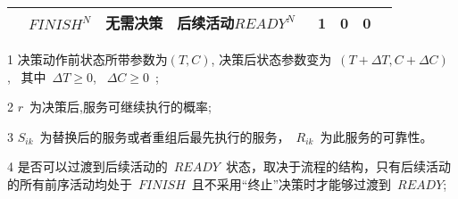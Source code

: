 \begin{table}[htbp]
\begin{threeparttable}
\begin{tabular}{llllllll}
            \multicolumn{1}{c}{} 
            & $FINISH^N$
            & \multicolumn{1}{c}{无需决策} 
            & \multicolumn{1}{l}{后续活动$READY^N$~\tnote{4}} 
            & \multicolumn{1}{c}{1} 
            & \multicolumn{1}{c}{0} 
            & \multicolumn{1}{c}{0} \\
            \bottomrule
            
        \end{tabular}%
        \begin{tablenotes}
            \item[1] 决策动作前状态所带参数为$(T,C)$, 决策后状态参数变为~$(T+\Delta T, C+\Delta C)$,~ 其中~$\Delta T \ge 0$, ~$\Delta C \ge 0$~; 
            \item[2] $r$~为决策后,服务可继续执行的概率;
            \item[3] $S_{ik}$~为替换后的服务或者重组后最先执行的服务，~$R_{ik}$~为此服务的可靠性。
            \item[4] 是否可以过渡到后续活动的~$READY$~状态，取决于流程的结构，只有后续活动的所有前序活动均处于~$FINISH$~且不采用“终止”决策时才能够过渡到~$READY$;
        \end{tablenotes}
    \end{threeparttable}
\end{table}%

